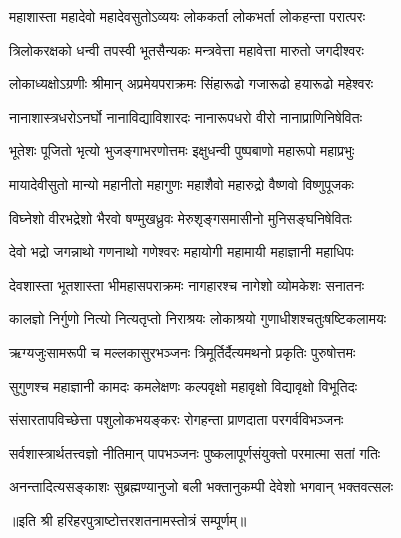 

\twolineshloka
{महाशास्ता महादेवो महादेवसुतोऽव्ययः}
{लोककर्ता लोकभर्ता लोकहन्ता परात्परः}

\twolineshloka
{त्रिलोकरक्षको धन्वी तपस्वी भूतसैन्यकः}
{मन्त्रवेत्ता महावेत्ता मारुतो जगदीश्वरः}

\twolineshloka
{लोकाध्यक्षोऽग्रणीः श्रीमान् अप्रमेयपराक्रमः}
{सिंहारूढो गजारूढो हयारूढो महेश्वरः}

\twolineshloka
{नानाशास्त्रधरोऽनर्घो नानाविद्याविशारदः}
{नानारूपधरो वीरो नानाप्राणिनिषेवितः}

\twolineshloka
{भूतेशः पूजितो भृत्यो भुजङ्गाभरणोत्तमः}
{इक्षुधन्वी पुष्पबाणो महारूपो महाप्रभुः}

\twolineshloka
{मायादेवीसुतो मान्यो महानीतो महागुणः}
{महाशैवो महारुद्रो वैष्णवो विष्णुपूजकः}

\twolineshloka
{विघ्नेशो वीरभद्रेशो भैरवो षण्मुखध्रुवः}
{मेरुशृङ्गसमासीनो मुनिसङ्घनिषेवितः}

\twolineshloka
{देवो भद्रो जगन्नाथो गणनाथो गणेश्वरः}
{महायोगी महामायी महाज्ञानी महाधिपः}

\twolineshloka
{देवशास्ता भूतशास्ता भीमहासपराक्रमः}
{नागहारश्च नागेशो व्योमकेशः सनातनः}

\twolineshloka
{कालज्ञो निर्गुणो नित्यो नित्यतृप्तो निराश्रयः}
{लोकाश्रयो गुणाधीशश्चतुःषष्टिकलामयः}

\twolineshloka
{ऋग्यजुःसामरूपी च मल्लकासुरभञ्जनः}
{त्रिमूर्तिर्दैत्यमथनो प्रकृतिः पुरुषोत्तमः}

\twolineshloka
{सुगुणश्च महाज्ञानी कामदः कमलेक्षणः}
{कल्पवृक्षो महावृक्षो विद्यावृक्षो विभूतिदः}

\twolineshloka
{संसारतापविच्छेत्ता पशुलोकभयङ्करः}
{रोगहन्ता प्राणदाता परगर्वविभञ्जनः}

\twolineshloka
{सर्वशास्त्रार्थतत्त्वज्ञो नीतिमान् पापभञ्जनः}
{पुष्कलापूर्णसंयुक्तो परमात्मा सतां गतिः}

\twolineshloka
{अनन्तादित्यसङ्काशः सुब्रह्मण्यानुजो बली}
{भक्तानुकम्पी देवेशो भगवान् भक्तवत्सलः}

{॥इति श्री हरिहरपुत्राष्टोत्तरशतनामस्तोत्रं सम्पूर्णम्॥}
